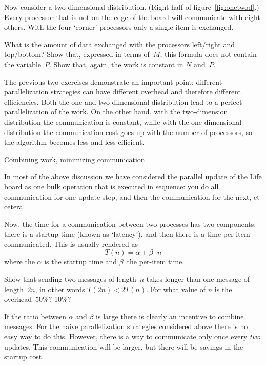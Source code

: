 Now consider a two-dimensional distribution. (Right half of
figure~\ref{fig:onetwod}.)  Every processor that is not on the edge of
the board will communicate with eight others. With the four `corner'
processors only a single item is exchanged.

\begin{exercise}
  What is the amount of data exchanged with the processors left/right
  and top/bottom? Show that, expressed in terms of~$M$, this formula
  does not contain the variable~$P$. Show that, again, the work is
  constant in $N$ and~$P$.
\end{exercise}

The previous two exercises demonstrate an important point: different
parallelization strategies can have different overhead and therefore
different efficiencies. Both the
one and two-dimensional distribution lead to a perfect parallelization
of the work. On the other hand, with the two-dimension distribution
the communication is constant, while with the one-dimensional distribution
the communication cost goes up with the number of processors, so the
algorithm becomes less and less efficient.

 {Combining work, minimizing communication}

In most of the above discussion we have considered the parallel update
of the Life board as one bulk operation that is executed in sequence:
you do all communication for one update step, and then the communication
for the next, et cetera.

Now, the time for a communication between two processes has two components:
there is a startup time (known as `latency'), and then there is a time
per item communicated. This is usually rendered as
\[ T(n) = \alpha+\beta\cdot n \]
where the $\alpha$ is the startup time and $\beta$~the per-item time.
 
\begin{exercise}
  Show that sending two messages of length~$n$ takes longer
  than one message of length~$2n$, in other words $T(2n)<2T(n)$.
  For what value of $n$ is the overhead~50\%? 10\%?
\end{exercise}

If the ratio between $\alpha$ and $\beta$ is large there is clearly
an incentive to combine messages. For the naive parallelization
strategies considered above there is no easy way to do this.
However, there is a way to communicate only once every \emph{two} 
updates. This communication will be larger, but there
will be savings in the startup cost.

